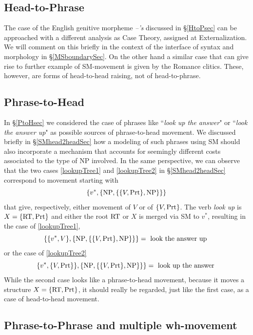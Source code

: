 \documentclass[12pt]{amsart}
\numberwithin{equation}{section}
\begin{document}
\medskip

\subsection{Head-to-Phrase}\label{XtoXPnoSMsec}

The case of the English genitive morpheme {\em --'s} discussed in \S \ref{HtoPsec} can be approached
with a different analysis as Case Theory, assigned at Externalization. We will comment on this briefly
in the context of the interface of syntax and morphology in \S \ref{MSboundarySec}. On the other hand
a similar case that can give rise to further example of SM-movement is given by the Romance clitics.
These, however, are forms of head-to-head raising, not of head-to-phrase.

\medskip

\subsection{Phrase-to-Head} \label{XPtoXPnoSMsec}

In \S \ref{PtoHsec} we considered the case of phrases like ``{\em look up the answer}" or
``{\em look the answer up}" as possible sources of phrase-to-head movement. 
We discussed briefly in \S \ref{SMhead2headSec} how a modeling of such phrases using
SM should also incorporate a mechanism that accounts for seemingly different costs 
associated to the type of NP involved.
In the same perspective, we can observe that the two cases \eqref{lookupTree1}
and \eqref{lookupTree2} in \S \ref{SMhead2headSec} correspond to
movement starting with 
$$ \{ v^*, \{ {\rm NP}, \{\{ V, {\rm Prt} \}, {\rm NP} \} \} \} $$ 
that give, respectively, either movement of $V$ or of $\{ V, {\rm Prt}\}$.
The verb {\em look up} is $X = \{ {\rm RT}, {\rm Prt} \}$ and either  the 
root ${\rm RT}$ or $X$ is merged via SM to $v^*$, resulting in the case of \eqref{lookupTree1},
$$ \{\{ v^*, V \}, \{ {\rm NP}, \{ \{ V, {\rm Prt} \}, {\rm NP} \} \} \} = \text{ look the answer up } $$
or the case of \eqref{lookupTree2} 
$$ \{ v^*, \{ V, {\rm Prt} \} \}, \{ {\rm NP}, \{ \{ V, {\rm Prt} \}, {\rm NP} \} \} \} = \text{ look up the answer } $$
While the second case looks like a
phrase-to-head movement, because it moves a structure $X = \{ {\rm RT}, {\rm Prt} \}$, 
it should really be regarded, just like the first case, as a case of head-to-head movement. 



\medskip
 \subsection{Phrase-to-Phrase and multiple wh-movement} \label{MWMsec}
 
\end{document}
